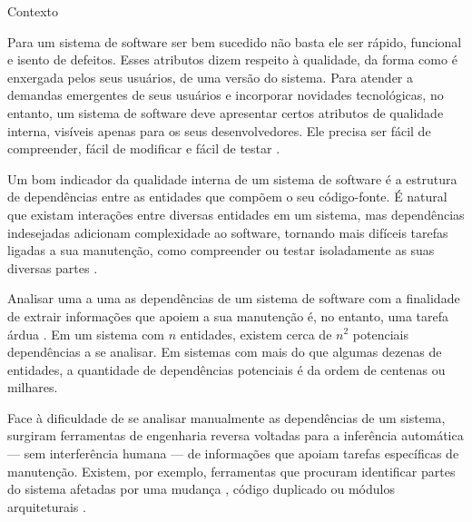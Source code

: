 \begin{section}{Contexto}

		Para um sistema de software ser bem sucedido não basta ele ser rápido, funcional e isento de defeitos. Esses atributos dizem respeito à qualidade, da forma como é enxergada pelos seus usuários, de uma versão do sistema. Para atender a demandas emergentes de seus usuários e incorporar novidades tecnológicas, no entanto, um sistema de software deve apresentar certos atributos de qualidade interna, visíveis apenas para os seus desenvolvedores. Ele precisa ser fácil de compreender, fácil de modificar e fácil de testar \cite{Parnas1994}.

		Um bom indicador da qualidade interna de um sistema de software é a estrutura de dependências entre as entidades que compõem o seu código-fonte. É natural que existam interações entre diversas entidades em um sistema, mas dependências indesejadas adicionam complexidade ao software, tornando mais difíceis tarefas ligadas a sua manutenção, como compreender ou testar isoladamente as suas diversas partes \cite{Chidamber1994}. %

		Analisar uma a uma as dependências de um sistema de software com a finalidade de extrair informações que apoiem a sua manutenção é, no entanto, uma tarefa árdua \cite{Tonella2007}. Em um sistema com $n$ entidades, existem cerca de $n^2$ potenciais dependências a se analisar. Em sistemas com mais do que algumas dezenas de entidades, a quantidade de dependências potenciais é da ordem de centenas ou milhares. %
		
		Face à dificuldade de se analisar manualmente as dependências de um sistema, surgiram ferramentas de engenharia reversa voltadas para a inferência automática --- sem interferência humana --- de informações que apoiam tarefas específicas de manutenção. Existem, por exemplo, ferramentas que procuram identificar partes do sistema afetadas por uma mudança \cite{Arnold1993}, código duplicado \cite{Roy2007} ou módulos arquiteturais \cite{Maqbool2007}. 



\end{section}

